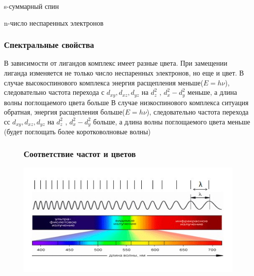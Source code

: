s-суммарный спин 

n-число неспаренных электронов 

\subsubsection{Спектральные свойства}
 В зависимости от лигандов комплекс имеет разные цвета. При замещении лиганда изменяется не только число неспаренных электронов, но еще и цвет. В случае высокоспинового комплекса энергия расщепления меньше($E=h\nu$), следовательно частота перехода с $d_{xy},d_{xz},d_{yz}$ на $d_z^2$ , $d_x^2-d_y^2$ меньше, а длина волны поглощаемого цвета больше В случае низкоспинового комплекса ситуация обратная, энергия расщепления больше($E=h\nu$), следовательно частота перехода сс $d_{xy},d_{xz},d_{yz}$ на $d_z^2$ , $d_x^2-d_y^2$ больше, а длина волны поглощаемого цвета меньше (будет поглощать более коротковолновые волны) \begin{figure}[htp]
 
\subsubsection{Соответствие частот и цветов}
\centering
\includegraphics[scale=.750]{images/spectre.jpg}
\end{figure}
 
 